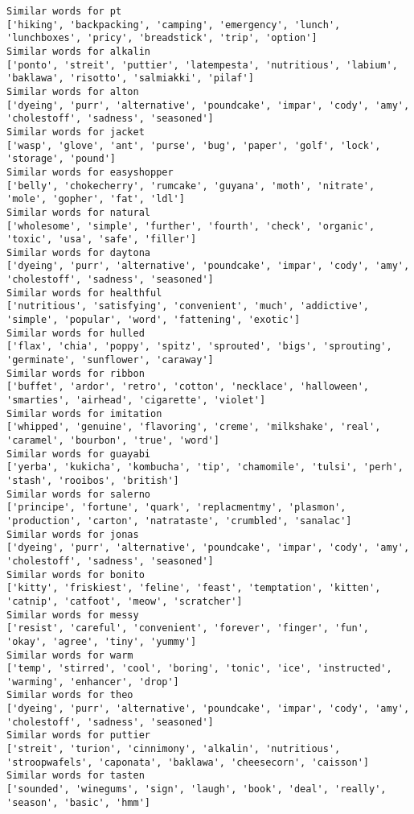 \documentclass[11pt]{article}
\begin{document}
\begin{Verbatim}[commandchars=\\\{\}]
Similar words for pt
['hiking', 'backpacking', 'camping', 'emergency', 'lunch', 'lunchboxes', 'pricy', 'breadstick', 'trip', 'option']
Similar words for alkalin
['ponto', 'streit', 'puttier', 'latempesta', 'nutritious', 'labium', 'baklawa', 'risotto', 'salmiakki', 'pilaf']
Similar words for alton
['dyeing', 'purr', 'alternative', 'poundcake', 'impar', 'cody', 'amy', 'cholestoff', 'sadness', 'seasoned']
Similar words for jacket
['wasp', 'glove', 'ant', 'purse', 'bug', 'paper', 'golf', 'lock', 'storage', 'pound']
Similar words for easyshopper
['belly', 'chokecherry', 'rumcake', 'guyana', 'moth', 'nitrate', 'mole', 'gopher', 'fat', 'ldl']
Similar words for natural
['wholesome', 'simple', 'further', 'fourth', 'check', 'organic', 'toxic', 'usa', 'safe', 'filler']
Similar words for daytona
['dyeing', 'purr', 'alternative', 'poundcake', 'impar', 'cody', 'amy', 'cholestoff', 'sadness', 'seasoned']
Similar words for healthful
['nutritious', 'satisfying', 'convenient', 'much', 'addictive', 'simple', 'popular', 'word', 'fattening', 'exotic']
Similar words for hulled
['flax', 'chia', 'poppy', 'spitz', 'sprouted', 'bigs', 'sprouting', 'germinate', 'sunflower', 'caraway']
Similar words for ribbon
['buffet', 'ardor', 'retro', 'cotton', 'necklace', 'halloween', 'smarties', 'airhead', 'cigarette', 'violet']
Similar words for imitation
['whipped', 'genuine', 'flavoring', 'creme', 'milkshake', 'real', 'caramel', 'bourbon', 'true', 'word']
Similar words for guayabi
['yerba', 'kukicha', 'kombucha', 'tip', 'chamomile', 'tulsi', 'perh', 'stash', 'rooibos', 'british']
Similar words for salerno
['principe', 'fortune', 'quark', 'replacmentmy', 'plasmon', 'production', 'carton', 'natrataste', 'crumbled', 'sanalac']
Similar words for jonas
['dyeing', 'purr', 'alternative', 'poundcake', 'impar', 'cody', 'amy', 'cholestoff', 'sadness', 'seasoned']
Similar words for bonito
['kitty', 'friskiest', 'feline', 'feast', 'temptation', 'kitten', 'catnip', 'catfoot', 'meow', 'scratcher']
Similar words for messy
['resist', 'careful', 'convenient', 'forever', 'finger', 'fun', 'okay', 'agree', 'tiny', 'yummy']
Similar words for warm
['temp', 'stirred', 'cool', 'boring', 'tonic', 'ice', 'instructed', 'warming', 'enhancer', 'drop']
Similar words for theo
['dyeing', 'purr', 'alternative', 'poundcake', 'impar', 'cody', 'amy', 'cholestoff', 'sadness', 'seasoned']
Similar words for puttier
['streit', 'turion', 'cinnimony', 'alkalin', 'nutritious', 'stroopwafels', 'caponata', 'baklawa', 'cheesecorn', 'caisson']
Similar words for tasten
['sounded', 'winegums', 'sign', 'laugh', 'book', 'deal', 'really', 'season', 'basic', 'hmm']

\end{Verbatim}
\end{document}
